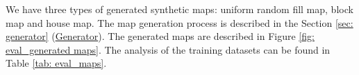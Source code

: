 We have three types of generated synthetic maps: uniform random fill map, block map and house map. The map generation process is described in the Section \ref {sec: generator} (\hyperref[sec: generator]{Generator}). The generated maps are described in Figure \ref{fig: eval_generated maps}. The analysis of the training datasets can be found in Table \ref{tab: eval_maps}.


